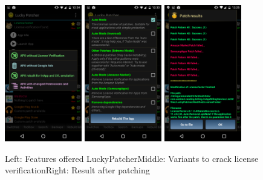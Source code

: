\begin{figure}[h]
    \centering
    \includegraphics[width=0.3\textwidth]{data/luckyFeatures.png}
    \includegraphics[width=0.3\textwidth]{data/luckyModi.png}
    \includegraphics[width=0.3\textwidth]{data/luckyPatching.png}
    \caption{Left: Features offered LuckyPatcher\newline Middle: Variants to crack license verification\newline Right: Result after patching}
    \label{fig:luckyInapp}
\end{figure}

